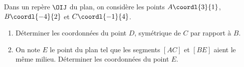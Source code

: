 \begin{exo}
	Dans un repère $\OIJ$ du plan, on considère les points $A\coordl{3}{1}$, $B\coordl{-4}{2}$ et $C\coordl{-1}{4}$.
	\begin{enumerate}
		\item Déterminer les coordonnées du point $D$, symétrique de $C$ par rapport à $B$.
		\item On note $E$ le point du plan tel que les segments $[AC]$ et $[BE]$ aient le même milieu. Déterminer les coordonnées du point $E$.
	\end{enumerate}
\end{exo}
